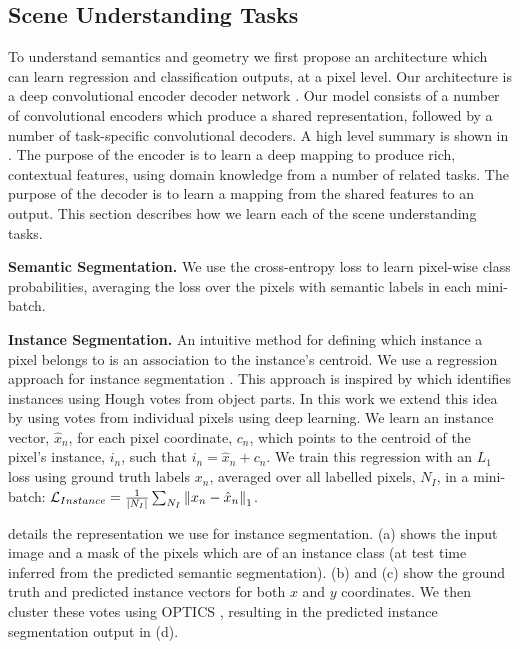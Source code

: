 \subsection{Scene Understanding Tasks}
\label{sec:arch}

To understand semantics and geometry we first propose an architecture which can learn regression and classification outputs, at a pixel level. Our architecture is a deep convolutional encoder decoder network \citep{badrinarayanan2017segnet}. Our model consists of a number of convolutional encoders which produce a shared representation, followed by a number of task-specific convolutional decoders. A high level summary is shown in . The purpose of the encoder is to learn a deep mapping to produce rich, contextual features, using domain knowledge from a number of related tasks. The purpose of the decoder is to learn a mapping from the shared features to an output. This section describes how we learn each of the scene understanding tasks.

\textbf{Semantic Segmentation.}
We use the cross-entropy loss to learn pixel-wise class probabilities, averaging the loss over the pixels with semantic labels in each mini-batch.

\textbf{Instance Segmentation.}
An intuitive method for defining which instance a pixel belongs to is an association to the instance's centroid.
We use a regression approach for instance segmentation \citep{liang2015proposal}. This approach is inspired by \citep{leibe2008robust} which identifies instances using Hough votes from object parts. In this work we extend this idea by using votes from individual pixels using deep learning. We learn an instance vector, $\hat{x}_n$, for each pixel coordinate, $c_n$, which points to the centroid of the pixel's instance, $i_n$, such that $i_n=\hat{x}_n+c_n$. We train this regression with an $L_1$ loss using ground truth labels $x_n$, averaged over all labelled pixels, $N_I$, in a mini-batch: $\mathcal{L}_{Instance} = \frac{1}{|N_I|} \sum_{N_I} \left\lVert x_n - \hat{x}_n \right\rVert_1$.

 details the representation we use for instance segmentation. (a) shows the input image and a mask of the pixels which are of an instance class (at test time inferred from the predicted semantic segmentation). (b) and (c) show the ground truth and predicted instance vectors for both $x$ and $y$ coordinates. We then cluster these votes using OPTICS \citep{ankerst1999optics}, resulting in the predicted instance segmentation output in (d).

